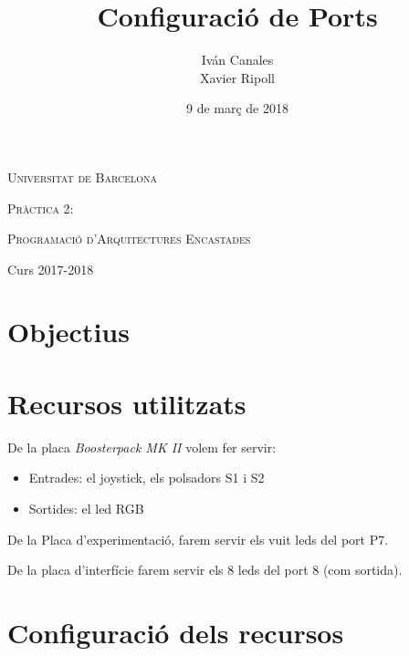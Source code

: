 \documentclass[12pt,a4paper]{article}
\title{Configuració de Ports}
\author{
    Iván Canales%
    \\
    Xavier Ripoll%
}
\date{9 de març de 2018}
\begin{document}

\begin{titlepage}
	\centering
	{\scshape\LARGE Universitat de Barcelona \par}
	\vspace{2cm}
	{\scshape\Large Pràctica 2:\par}
	\vspace{1cm}
	{\huge\bfseries \thetitle \par}

    \vfill
    \large\theauthor
	\vfill
	\raggedleft

    \par

    {\scshape Programació d'Arquitectures Encastades\par}
    \texttt{}{Curs 2017-2018\par} %
    \thedate


\end{titlepage} \pagebreak

\section{Objectius}

\section{Recursos utilitzats}
De la placa \textit{Boosterpack MK II} volem fer servir:

\begin{itemize}
    \item Entrades: el joystick, els polsadors S1 i S2
    \item Sortides: el led RGB
\end{itemize}

De la Placa d'experimentació, farem servir els vuit leds del port P7.

De la placa d'interfície farem servir els 8 leds del port 8 (com sortida).

\section{Configuració dels recursos}
\end{document}
